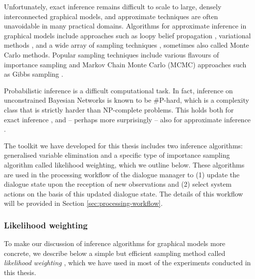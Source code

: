 Unfortunately, exact inference remains difficult to scale to large, densely interconnected graphical models, and  approximate techniques are often unavoidable in many practical domains.  Algorithms for approximate inference
 in graphical models include approaches such as loopy belief propagation \citep{Murphy:1999}, variational methods \citep{Jordan:1999},  and a wide array of sampling techniques \citep{mackay1998introduction}, sometimes also called Monte Carlo methods. Popular sampling techniques include various flavours of importance sampling \citep{FungC89,cheng2000ais} and Markov Chain Monte Carlo (MCMC) approaches such as Gibbs sampling \citep{pearl1987evidential,gamerman2006markov}. %

Probabilistic inference is a difficult computational task.  In fact, inference on unconstrained Bayesian Networks is known to be {\#}P-hard, which is a complexity class that is strictly harder than NP-complete problems.  This holds both for exact inference \citep{Cooper90}, and -- perhaps more surprisingly -- also for approximate inference \citep{Dagum1993}.  


The \opendial{} toolkit we have developed for this thesis includes two inference algorithms: generalised variable elimination \citep[][p. 1103]{Koller+Friedman:09} and a specific type of importance sampling algorithm called likelihood weighting, which we outline below. These algorithms are used in the processing workflow of the dialogue manager to (1) update the dialogue state upon the reception of new observations and (2) select system actions on the basis of this updated dialogue state. The details of this workflow will be provided in Section \ref{sec:processing-workflow}.  

\subsubsection*{Likelihood weighting} 

To make our discussion of inference algorithms for graphical models more concrete, we describe below a simple but efficient sampling method called \textit{likelihood weighting} \citep{FungC89}, which we have used in most of the experiments conducted in this thesis.  

